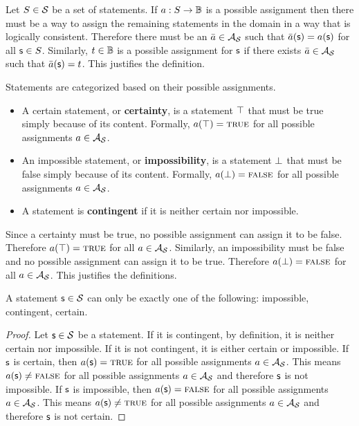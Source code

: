 \documentclass[11pt,letterpaper,fleqn]{memoir} %
\begin{document}
\begin{mathSection}
\begin{justification}
	Let $S \in \mathcal{S}$ be a set of statements. If $a : S \to \mathbb{B}$ is a possible assignment then there must be a way to assign the remaining statements in the domain in a way that is logically consistent. Therefore there must be an $\bar{a} \in \mathcal{A}_{\mathcal{S}}$ such that $\bar{a}(\mathsf{s}) = a(\mathsf{s})$ for all $\mathsf{s} \in S$. Similarly, $t \in \mathbb{B}$ is a possible assignment for $\mathsf{s}$ if there exists $\bar{a} \in \mathcal{A}_{\mathcal{S}}$ such that $\bar{a}(\mathsf{s}) = t$. This justifies the definition.
\end{justification}

\begin{defn}
	Statements are categorized based on their possible assignments.
	
	\begin{itemize}
		\item A certain statement, or \textbf{certainty}, is a statement $\top$ that must be true simply because of its content. Formally, $a(\top) = \textsc{true}$ for all possible assignments $a \in \mathcal{A}_{\mathcal{S}}$.
		\item An impossible statement, or \textbf{impossibility}, is a statement $\bot$ that must be false simply because of its content. Formally, $a(\bot) = \textsc{false}$ for all possible assignments $a \in \mathcal{A}_{\mathcal{S}}$.
		\item A statement is \textbf{contingent} if it is neither certain nor impossible.
	\end{itemize}
	
\end{defn}

\begin{justification}
	Since a certainty must be true, no possible assignment can assign it to be false. Therefore $a(\top) = \textsc{true}$ for all $a \in \mathcal{A}_{\mathcal{S}}$. Similarly, an impossibility must be false and no possible assignment can assign it to be true. Therefore $a(\bot) = \textsc{false}$ for all $a \in \mathcal{A}_{\mathcal{S}}$. This justifies the definitions.
\end{justification}

\begin{coro}
	A statement $\mathsf{s} \in \mathcal{S}$ can only be exactly one of the following: impossible, contingent, certain.
\end{coro}

\begin{proof}
	Let $\mathsf{s} \in \mathcal{S}$ be a statement. If it is contingent, by definition, it is neither certain nor impossible. If it is not contingent, it is either certain or impossible. If $\mathsf{s}$ is certain, then $a(\mathsf{s}) = \textsc{true}$ for all possible assignments $a \in \mathcal{A}_{\mathcal{S}}$. This means $a(\mathsf{s}) \neq \textsc{false}$ for all possible assignments $a \in \mathcal{A}_{\mathcal{S}}$ and therefore $\mathsf{s}$ is not impossible. If $\mathsf{s}$ is impossible, then $a(\mathsf{s}) = \textsc{false}$ for all possible assignments $a \in \mathcal{A}_{\mathcal{S}}$. This means $a(\mathsf{s}) \neq \textsc{true}$ for all possible assignments $a \in \mathcal{A}_{\mathcal{S}}$ and therefore $\mathsf{s}$ is not certain.
\end{proof}

\end{mathSection}
\end{document}
